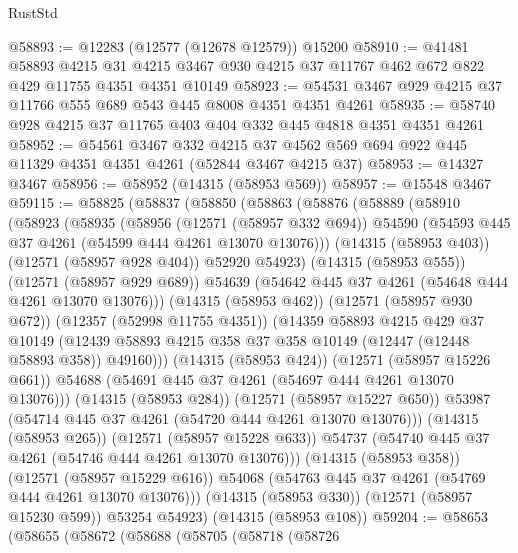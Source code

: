 \begin{lexlean}{RustStd}
\begin{coremodule}
@58893 := @12283 (@12577 (@12678 @12579)) @15200
@58910 := @41481
    @58893
    @4215
    @31
    @4215
    @3467
    @930
    @4215
    @37
    @11767
    @462
    @672
    @822
    @429
    @11755
    @4351
    @4351
    @10149
@58923 := @54531 @3467 @929 @4215 @37 @11766 @555 @689 @543 @445 @8008 @4351 @4351 @4261
@58935 := @58740 @928 @4215 @37 @11765 @403 @404 @332 @445 @4818 @4351 @4351 @4261
@58952 := @54561
    @3467
    @332
    @4215
    @37
    @4562
    @569
    @694
    @922
    @445
    @11329
    @4351
    @4351
    @4261
    (@52844 @3467 @4215 @37)
@58953 := @14327 @3467
@58956 := @58952 (@14315 (@58953 @569))
@58957 := @15548 @3467
@59115 := @58825
    (@58837
      (@58850
        (@58863
          (@58876
            (@58889
              (@58910
                (@58923
                  (@58935
                    (@58956
                      (@12571 (@58957 @332 @694))
                      @54590
                      (@54593 @445 @37 @4261 (@54599 @444 @4261 @13070 @13076)))
                    (@14315 (@58953 @403))
                    (@12571 (@58957 @928 @404))
                    @52920
                    @54923)
                  (@14315 (@58953 @555))
                  (@12571 (@58957 @929 @689))
                  @54639
                  (@54642 @445 @37 @4261 (@54648 @444 @4261 @13070 @13076)))
                (@14315 (@58953 @462))
                (@12571 (@58957 @930 @672))
                (@12357 (@52998 @11755 @4351))
                (@14359
                  @58893
                  @4215
                  @429
                  @37
                  @10149
                  (@12439 @58893 @4215 @358 @37 @358 @10149 (@12447 (@12448 @58893 @358)) @49160)))
              (@14315 (@58953 @424))
              (@12571 (@58957 @15226 @661))
              @54688
              (@54691 @445 @37 @4261 (@54697 @444 @4261 @13070 @13076)))
            (@14315 (@58953 @284))
            (@12571 (@58957 @15227 @650))
            @53987
            (@54714 @445 @37 @4261 (@54720 @444 @4261 @13070 @13076)))
          (@14315 (@58953 @265))
          (@12571 (@58957 @15228 @633))
          @54737
          (@54740 @445 @37 @4261 (@54746 @444 @4261 @13070 @13076)))
        (@14315 (@58953 @358))
        (@12571 (@58957 @15229 @616))
        @54068
        (@54763 @445 @37 @4261 (@54769 @444 @4261 @13070 @13076)))
      (@14315 (@58953 @330))
      (@12571 (@58957 @15230 @599))
      @53254
      @54923)
    (@14315 (@58953 @108))
@59204 := @58653
    (@58655
      (@58672
        (@58688
          (@58705
            (@58718
              (@58726

\end{coremodule}
\end{lexlean}
